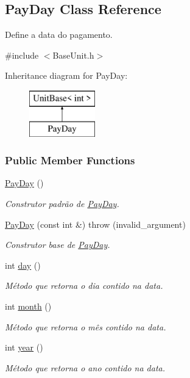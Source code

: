 \hypertarget{classPayDay}{\subsection{Pay\-Day Class Reference}
\label{dc/d17/classPayDay}
}


Define a data do pagamento.  




{\ttfamily \#include $<$Base\-Unit.\-h$>$}

Inheritance diagram for Pay\-Day\-:\begin{figure}[H]
\begin{center}
\leavevmode
\includegraphics[height=2.000000cm]{dc/d17/classPayDay}
\end{center}
\end{figure}
\subsubsection*{Public Member Functions}
\begin{DoxyCompactItemize}
\item 
\hyperlink{classPayDay_a6da36cea0b2ac9a53106552aad00996a}{Pay\-Day} ()
\begin{DoxyCompactList}\small\item\em Construtor padrão de \hyperlink{classPayDay}{Pay\-Day}. \end{DoxyCompactList}\item 
\hyperlink{classPayDay_aa11abdfdb58bbd93f68bc02a7496e1c4}{Pay\-Day} (const int \&)  throw (invalid\-\_\-argument)
\begin{DoxyCompactList}\small\item\em Construtor base de \hyperlink{classPayDay}{Pay\-Day}. \end{DoxyCompactList}\item 
int \hyperlink{classPayDay_a297ce892f49aa9f3a504d514f171ed1d}{day} ()
\begin{DoxyCompactList}\small\item\em Método que retorna o dia contido na data. \end{DoxyCompactList}\item 
int \hyperlink{classPayDay_ada65e8834c142a95cd35ca2b399fbcde}{month} ()
\begin{DoxyCompactList}\small\item\em Método que retorna o mês contido na data. \end{DoxyCompactList}\item 
int \hyperlink{classPayDay_a962960925f9e6eaaac0fef5eb96849ec}{year} ()
\begin{DoxyCompactList}\small\item\em Método que retorna o ano contido na data. \end{DoxyCompactList}\end{DoxyCompactItemize}
